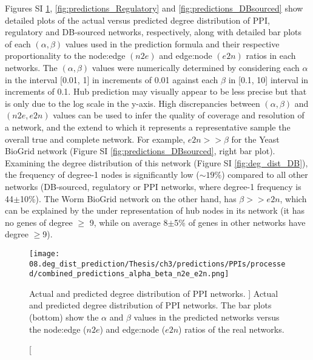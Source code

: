 \documentclass[12pt]{article}	%
\begin{document}
        Figures SI \ref{fig:predictions_PPIs}, \ref{fig:predictions_Regulatory} and \ref{fig:predictions_DBsourced} show detailed plots of the actual versus predicted degree distribution of PPI, regulatory and DB-sourced networks, respectively, along with detailed bar plots of each $(\alpha,\beta)$ values used in the prediction formula and their respective proportionality to the node:edge $(n2e)$
        and edge:node $(e2n)$ ratios in each networks.
        The $(\alpha,\beta)$ values were  numerically determined by considering each $\alpha$ in the interval [0.01, 1] in increments of 0.01 against each $\beta$ in [0.1, 10] interval in increments of 0.1.
        Hub prediction may visually appear  to be less precise but that is only due to the log scale in the y-axis. High discrepancies between $(\alpha,\beta)$ and $(n2e,e2n)$ values can be used to infer the quality of coverage and resolution of a network, and the extend to which it represents a representative sample the overall true and complete network. For example, $e2n >> \beta$ for the Yeast BioGrid network (Figure SI \ref{fig:predictions_DBsourced}, right bar plot). Examining the degree distribution of this network (Figure SI \ref{fig:deg_dist_DB}), the frequency of degree-1 nodes is significantly low (${\sim}19\%$) compared to all other networks (DB-sourced, regulatory or PPI networks, where degree-1 frequency is 44$\pm$10\%). The Worm BioGrid network on the other hand, has $\beta >> e2n$, which can be explained by the under representation of hub nodes in its network (it has no genes of degree $\geq$ 9, while on average 8$\pm$5\% of genes in other networks have degree $\geq$9).

    	\begin{figure}[H]%
    			\centering
    					\texttt{[image: 08.deg\_dist\_prediction/Thesis/ch3/predictions/PPIs/processed/combined\_predictions\_alpha\_beta\_n2e\_e2n.png]}
    					\caption
                            [
                                Actual and predicted degree distribution of PPI networks.
                            ]
                            {
                                Actual and predicted degree distribution of PPI networks. The bar plots (bottom) show the $\alpha$ and $\beta$ values in the predicted networks versus the node:edge ($n2e$) and edge:node ($e2n$) ratios of the real networks.
                            }
    					\label{fig:predictions_PPIs}
    	\end{figure}
\end{document}

